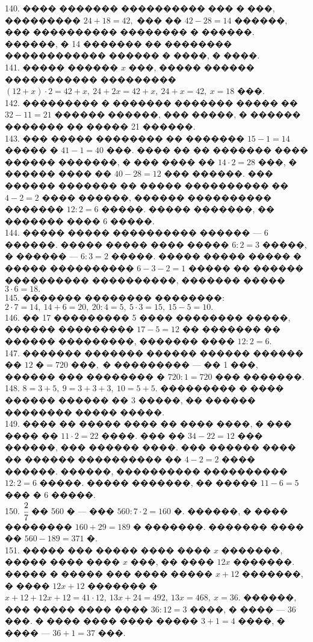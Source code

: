 \documentclass[12pt]{article}
\begin{document}
140. ���� ������� ���������� ��� � ���, ��������� $24+18=42,$ ��� �� $42-28=14$ ������, ��� ���������� �������� � ������. ������, � 14 ������� �� �������� ������������ ������ � ����, � ����.\\
141. ����� ������ $x$ ���, ����� ������ ����������� ��������� $(12+x)\cdot2=42+x,\ 24+2x=42+x,\ 24+x=42,\ x=18$ ���.\\
142. ��������� � ������� ������� ����� �� $32-11=21$ ������ ������, ��� �����, � ������ ������� �� ����� 21 ������.\\
143. ��� ����� �������� �� ������� $15-1=14$ ����� � $41-1=40$ ���. ���� �� �� ������� ���� ������ �������, � ��� ���� �� $14\cdot2=28$ ���, � ������ ���� �� $40-28=12$ ��� ������. ��� ������ ������� �� ����� ���������� �� $4-2=2$ ���� ������, ������ ���������� ������� $12:2=6$ �����. ����� �������, �� ������� ���� 6 �����.\\
144. ����� ����� ���������� ������ --- 6 ������. ����� ����� ���� ����� $6:2=3$ �����, � ������ --- $6:3=2$ �����. ����� ����� ����� � ����� ���������� $6-3-2=1$ ����� �� ������ ���������� ����������, ������� ����� $3\cdot6=18.$\\
145. ������� �������� ��������: $2\cdot7=14,\ 14+6=20,\ 20:4=5,\ 5\cdot3=15,\ 15-5=10.$\\
146. �� 17 ��������� 5 ���� �������� �����, ������ ��������� $17-5=12$ �� ������� �� ������ ���������, ������� ���� $12:2=6.$\\
147. ������� ������� ������ ������ ������ �� $12\text{ �}=720\text{ ���},$ � ��������� --- �� 1 ���, ������ ��� �������� � $720:1=720$ ��� �������.\\
148. $8=3+5,\ 9=3+3+3,\ 10=5+5.$ ��������� � ���� ������ ������ �� 3 �����, �� ������ �������� ����� �����.\\
149. ���� �� ����� ���� �� ���� ����, � ��� ���� �� $11\cdot2=22$ ����. ��� �� $34-22=12$ ��� ������, ��� ������ ����. ��� ������ ���� �� ������ ���������� �� $4-2=2$ ���� ������. ������, ���������� ���������� $12:2=6$ �����. ����� �������, �� ����� $11-6=5$ ��� � 6 �����.\\
150. $\cfrac{2}{7}$ �� 560 � --- ��� $560:7\cdot2=160$ �. ������, � ���� �������� $160+29=189$ � �������. ������� ���� �� $560-189=371$ �.\\
151. ����� ��� ����� ���� ���� $x$ �������, ����� ���� ���� $x$ ���, �� ���� $12x$ �������. ����� � ����� ��� ���� ����� $x+12$ �������, � ���� $12x+12$ �������
� $x+12+12x+12=41\cdot12,\ 13x+24=492,\ 13x=468,\ x=36.$ ������, ��� ����� ���� ���� $36:12=3$ ����, � ���� --- 36 ���. � ���� ���� ���� ����� $3+1=4$ ����, � ���� --- $36+1=37$ ���.\\
\end{document}

